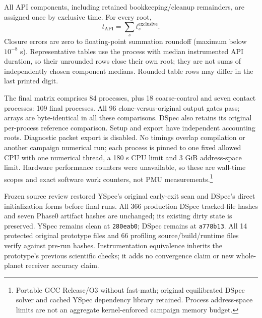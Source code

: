 All API components, including retained bookkeeping/cleanup remainders, are assigned once by exclusive time. For every root,
\begin{equation}
t_{\mathrm{API}}=\sum_s t_s^{\mathrm{exclusive}}.
\end{equation}
Closure errors are zero to floating-point summation roundoff (maximum below $10^{-8}$ s). Representative tables use the process with median instrumented API duration, so their unrounded rows close their own root; they are not sums of independently chosen component medians. Rounded table rows may differ in the last printed digit.

The final matrix comprises 84 processes, plus 18 coarse-control and seven contact processes: 109 final processes. All 96 clone-versus-original output gates pass; arrays are byte-identical in all these comparisons. DSpec also retains its original per-process reference comparison. Setup and export have independent accounting roots. Diagnostic packet export is disabled. No timings overlap compilation or another campaign numerical run; each process is pinned to one fixed allowed CPU with one numerical thread, a 180 s CPU limit and 3 GiB address-space limit. Hardware performance counters were unavailable, so these are wall-time scopes and exact software work counters, not PMU measurements.\footnote{Portable GCC Release/O3 without fast-math; original equilibrated DSpec solver and cached YSpec dependency library retained. Process address-space limits are not an aggregate kernel-enforced campaign memory budget.}

Frozen source review restored YSpec's original early-exit scan and DSpec's direct initialization forms before final runs. All 366 production DSpec tracked-file hashes and seven Phase0 artifact hashes are unchanged; its existing dirty state is preserved. YSpec remains clean at \texttt{280eab0}; DSpec remains at \texttt{a778b13}. All 14 protected original prototype files and 66 profiling source/build/runtime files verify against pre-run hashes. Instrumentation equivalence inherits the prototype's previous scientific checks; it adds no convergence claim or new whole-planet receiver accuracy claim.

